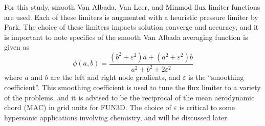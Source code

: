 For this study, smooth Van Albada\cite{van1997comparative}, Van
Leer\cite{vatsa2009calibration}, and Minmod\cite{roe1986characteristic} flux
limiter functions are used.  Each of these limiters is augmented with a
heuristic pressure limiter by Park\cite{park2008anisotropic}. The choice of
these limiters impacts solution converge and accuracy, and it is important to
note specifics of the smooth Van Albada averaging function is given as
\begin{equation}
  \phi\left( a, b \right) =
  \frac{(b^2 + \varepsilon^2)a + (a^2 + \varepsilon^2)b}
  {a^2 + b^2 + 2\varepsilon^2}
  \label{van-albada-avg}
\end{equation}
where $a$ and $b$ are the left and right node gradients, and $\varepsilon$ is
the ``smoothing coefficient''.  This smoothing coefficient is used to tune the
flux limiter to a variety of the problems, and it is advised to be the
reciprocal of the mean aerodynamic chord (MAC) in grid units for
FUN3D\cite{biedron2016fun3d}.  The choice of $\varepsilon$ is critical to some
hypersonic applications involving chemistry, and will be discussed later.

